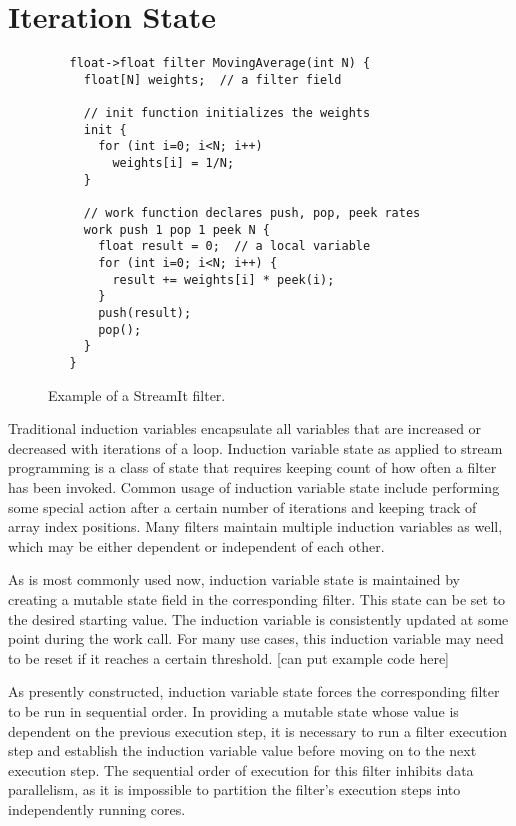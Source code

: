 \section{Iteration State}

\begin{figure}[t]
{\eightpoint
\begin{verbatim}
   float->float filter MovingAverage(int N) {
     float[N] weights;  // a filter field

     // init function initializes the weights
     init {
       for (int i=0; i<N; i++)
         weights[i] = 1/N;
     }

     // work function declares push, pop, peek rates
     work push 1 pop 1 peek N {
       float result = 0;  // a local variable
       for (int i=0; i<N; i++) {
         result += weights[i] * peek(i);
       }
       push(result);
       pop();
     }
   } 
\end{verbatim}
\caption{Example of a StreamIt filter.\protect\label{fig:filter-example}}}
\end{figure}


Traditional induction variables encapsulate all variables that are
increased or decreased with iterations of a loop.  Induction variable
state as applied to stream programming is a class of state that
requires keeping count of how often a filter has been invoked.  Common
usage of induction variable state include performing some special
action after a certain number of iterations and keeping track of array
index positions.  Many filters maintain multiple induction variables
as well, which may be either dependent or independent of each other.

As is most commonly used now, induction variable state is maintained
by creating a mutable state field in the corresponding filter.  This
state can be set to the desired starting value.  The induction
variable is consistently updated at some point during the work call.
For many use cases, this induction variable may need to be reset if it
reaches a certain threshold. [can put example code here]

As presently constructed, induction variable state forces the
corresponding filter to be run in sequential order.  In providing a
mutable state whose value is dependent on the previous execution step,
it is necessary to run a filter execution step and establish the
induction variable value before moving on to the next execution step.
The sequential order of execution for this filter inhibits data
parallelism, as it is impossible to partition the filter's execution
steps into independently running cores.


